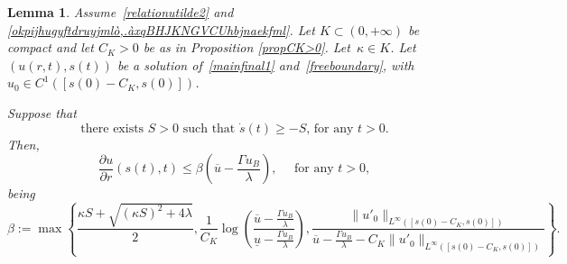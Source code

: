\documentclass[12pt,a4paper,intlimits,sumlimits]{amsart}
\theoremstyle{definition}
\theoremstyle{plain}
\newtheorem{lemma}[definition]{Lemma}
\numberwithin{equation}{section}
\renewcommand{\le}{\leqslant}
\renewcommand{\ge}{\geqslant}
\begin{document}
\begin{lemma}\label{barrieradasopra}
Assume~\eqref{relationutilde2} and \eqref{okpijhugyftdruyjmlò,.àxqBHJKNGVCUhbjnaekfml}.
Let $K\subset (0, +\infty)$ be compact and let $C_K>0$ be as in Proposition \ref{propCK>0}.
Let~$\kappa\in K$.
Let $(u(r,t), s(t))$ be a solution of~\eqref{mainfinal1} and~\eqref{freeboundary}, with~$u_0\in C^1([s(0)-C_K, s(0)])$.

Suppose that
\begin{equation}\label{2fhojabkcsbhigfueabjckvgòu}
\mbox{there exists $S>0$ such that $\dot{s}(t)\ge - S$, for any $t>0$}.
\end{equation}
Then,
\begin{equation}\label{PKA:SNFVBAol2dPjmsd}
\dfrac{\partial u}{\partial r}(s(t), t) \le \beta\left(\overline u -\frac{\Gamma u_B}{\lambda}\right),\quad\mbox{ for any } t>0,
\end{equation}
being
\begin{equation}\label{kpmnojbixhvubijnokmòlcvgjklmò,.}
\beta:=\max\left\{\dfrac{\kappa S +\sqrt{(\kappa S)^2 +4\lambda}}{2}, \frac{1}{C_K}\log\left(\dfrac{\overline u-\frac{\Gamma u_B}{\lambda}}{\underline u-\frac{\Gamma u_B}{\lambda}}\right), \dfrac{\|u'_0\|_{L^\infty([s(0)-C_K, s(0)])}}{\overline u-\frac{\Gamma u_B}{\lambda}-C_K\|u'_0\|_{L^\infty([s(0)-C_K, s(0)])}}\right\}. 
\end{equation}
\end{lemma}
\end{document}
